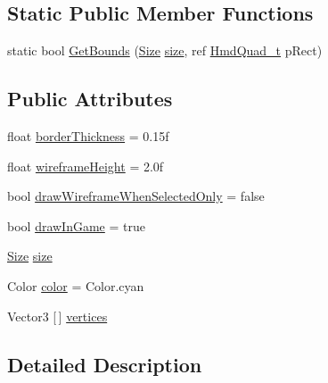\subsection*{Static Public Member Functions}
\begin{DoxyCompactItemize}
\item 
static bool \mbox{\hyperlink{class_valve_1_1_v_r_1_1_steam_v_r___play_area_ae0c43679b65e56dcef65bb1ee5da2553}{Get\+Bounds}} (\mbox{\hyperlink{class_valve_1_1_v_r_1_1_steam_v_r___play_area_a4c0fc5be21f78998e4a1fbef713d2f24}{Size}} \mbox{\hyperlink{class_valve_1_1_v_r_1_1_steam_v_r___play_area_a37490b9d6d24bff01c00c35772e4d561}{size}}, ref \mbox{\hyperlink{struct_valve_1_1_v_r_1_1_hmd_quad__t}{Hmd\+Quad\+\_\+t}} p\+Rect)
\end{DoxyCompactItemize}
\subsection*{Public Attributes}
\begin{DoxyCompactItemize}
\item 
float \mbox{\hyperlink{class_valve_1_1_v_r_1_1_steam_v_r___play_area_a583329fcea96cc87a1c5c3c74e494daa}{border\+Thickness}} = 0.\+15f
\item 
float \mbox{\hyperlink{class_valve_1_1_v_r_1_1_steam_v_r___play_area_acd342cca6da262141cbbd1b93e1150e4}{wireframe\+Height}} = 2.\+0f
\item 
bool \mbox{\hyperlink{class_valve_1_1_v_r_1_1_steam_v_r___play_area_ae1ced876a15067bcd9c9e154c4dc6fc0}{draw\+Wireframe\+When\+Selected\+Only}} = false
\item 
bool \mbox{\hyperlink{class_valve_1_1_v_r_1_1_steam_v_r___play_area_a0749b75af7ac47d0ff6d4cc135ad33d0}{draw\+In\+Game}} = true
\item 
\mbox{\hyperlink{class_valve_1_1_v_r_1_1_steam_v_r___play_area_a4c0fc5be21f78998e4a1fbef713d2f24}{Size}} \mbox{\hyperlink{class_valve_1_1_v_r_1_1_steam_v_r___play_area_a37490b9d6d24bff01c00c35772e4d561}{size}}
\item 
Color \mbox{\hyperlink{class_valve_1_1_v_r_1_1_steam_v_r___play_area_a7bea4da346f28a3b3a2f512dc4cabeed}{color}} = Color.\+cyan
\item 
Vector3 \mbox{[}$\,$\mbox{]} \mbox{\hyperlink{class_valve_1_1_v_r_1_1_steam_v_r___play_area_ac864c9b919423e19e47840a9db0b663a}{vertices}}
\end{DoxyCompactItemize}


\subsection{Detailed Description}


